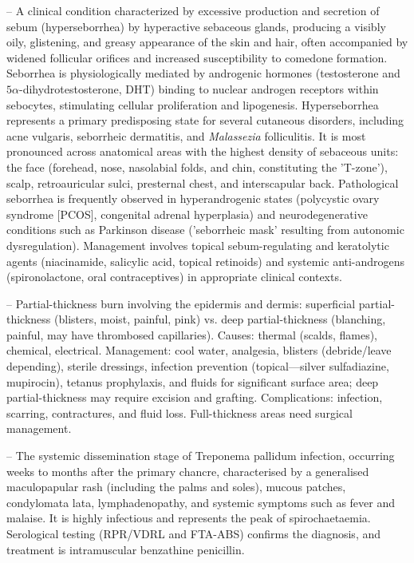 -- A clinical condition characterized by excessive production and secretion of sebum (hyperseborrhea) by hyperactive sebaceous glands, producing a visibly oily, glistening, and greasy appearance of the skin and hair, often accompanied by widened follicular orifices and increased susceptibility to comedone formation. Seborrhea is physiologically mediated by androgenic hormones (testosterone and $5\alpha$-dihydrotestosterone, DHT) binding to nuclear androgen receptors within sebocytes, stimulating cellular proliferation and lipogenesis. Hyperseborrhea represents a primary predisposing state for several cutaneous disorders, including acne vulgaris, seborrheic dermatitis, and \textit{Malassezia} folliculitis. It is most pronounced across anatomical areas with the highest density of sebaceous units: the face (forehead, nose, nasolabial folds, and chin, constituting the 'T-zone'), scalp, retroauricular sulci, presternal chest, and interscapular back. Pathological seborrhea is frequently observed in hyperandrogenic states (polycystic ovary syndrome [PCOS], congenital adrenal hyperplasia) and neurodegenerative conditions such as Parkinson disease ('seborrheic mask' resulting from autonomic dysregulation). Management involves topical sebum-regulating and keratolytic agents (niacinamide, salicylic acid, topical retinoids) and systemic anti-androgens (spironolactone, oral contraceptives) in appropriate clinical contexts.

-- Partial-thickness burn involving the epidermis and dermis: superficial partial-thickness (blisters, moist, painful, pink) vs. deep partial-thickness (blanching, painful, may have thrombosed capillaries). Causes: thermal (scalds, flames), chemical, electrical. Management: cool water, analgesia, blisters (debride/leave depending), sterile dressings, infection prevention (topical—silver sulfadiazine, mupirocin), tetanus prophylaxis, and fluids for significant surface area; deep partial-thickness may require excision and grafting. Complications: infection, scarring, contractures, and fluid loss. Full-thickness areas need surgical management.

-- The systemic dissemination stage of Treponema pallidum infection, occurring weeks to months after the primary chancre, characterised by a generalised maculopapular rash (including the palms and soles), mucous patches, condylomata lata, lymphadenopathy, and systemic symptoms such as fever and malaise. It is highly infectious and represents the peak of spirochaetaemia. Serological testing (RPR/VDRL and FTA-ABS) confirms the diagnosis, and treatment is intramuscular benzathine penicillin.

